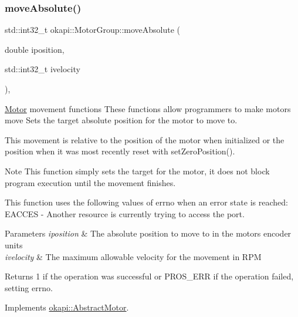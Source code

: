 \subsubsection{\texorpdfstring{moveAbsolute()}{moveAbsolute()}}
{\footnotesize\ttfamily std\+::int32\+\_\+t okapi\+::\+Motor\+Group\+::move\+Absolute (\begin{DoxyParamCaption}\item[{double}]{iposition,  }\item[{std\+::int32\+\_\+t}]{ivelocity }\end{DoxyParamCaption})\hspace{0.3cm}{\ttfamily [override]}, {\ttfamily [virtual]}}

\mbox{\hyperlink{classokapi_1_1Motor}{Motor}} movement functions These functions allow programmers to make motors move Sets the target absolute position for the motor to move to.

This movement is relative to the position of the motor when initialized or the position when it was most recently reset with set\+Zero\+Position().

\begin{DoxyNote}{Note}
This function simply sets the target for the motor, it does not block program execution until the movement finishes.
\end{DoxyNote}
This function uses the following values of errno when an error state is reached\+: E\+A\+C\+C\+ES -\/ Another resource is currently trying to access the port.


\begin{DoxyParams}{Parameters}
{\em iposition} & The absolute position to move to in the motor\textquotesingle{}s encoder units \\
\hline
{\em ivelocity} & The maximum allowable velocity for the movement in R\+PM \\
\hline
\end{DoxyParams}
\begin{DoxyReturn}{Returns}
1 if the operation was successful or {\ttfamily P\+R\+O\+S\+\_\+\+E\+RR} if the operation failed, setting errno. 
\end{DoxyReturn}


Implements \mbox{\hyperlink{classokapi_1_1AbstractMotor_ab84ff0f3e39fa14dcf74bcc867863ff8}{okapi\+::\+Abstract\+Motor}}.

\mbox{\label{classokapi_1_1MotorGroup_a4295103133b5cb721dfb457a8cc8c2bc}} 

